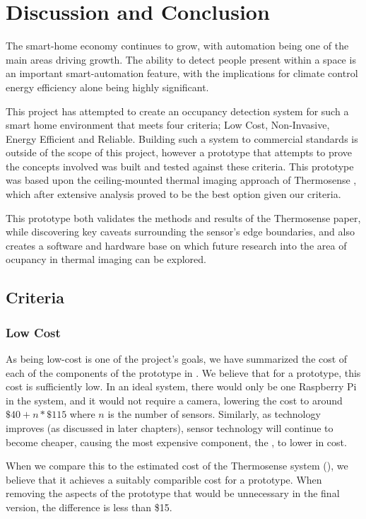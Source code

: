 \documentclass[../thesis/thesis.tex]{subfiles}
\begin{document}
 \chapter{Discussion and Conclusion}
The smart-home economy continues to grow, with automation being one of the main areas driving growth. The ability to detect people present within a space is an important smart-automation feature, with the implications for climate control energy efficiency alone being highly significant.

This project has attempted to create an occupancy detection system for such a smart home environment that meets four criteria; Low Cost, Non-Invasive, Energy Efficient and Reliable. Building such a system to commercial standards is outside of the scope of this project, however a prototype that attempts to prove the concepts involved was built and tested against these criteria. This prototype was based upon the ceiling-mounted thermal imaging approach of Thermosense \cite{beltran2013thermosense}, which after extensive analysis proved to be the best option given our criteria.

This prototype both validates the methods and results of the Thermosense paper, while discovering key caveats surrounding the sensor's edge boundaries, and also creates a software and hardware base on which future research into the area of ocupancy in thermal imaging can be explored.

\section{Criteria}

\subsection{Low Cost}
As being low-cost is one of the project's goals, we have summarized the cost of each of the components of the prototype in . We believe that for a prototype, this cost is sufficiently low. In an ideal system, there would only be one Raspberry Pi in the system, and it would not require a camera, lowering the cost to around $\$40 + n * \$115$ where $n$ is the number of sensors. Similarly, as technology improves (as discussed in later chapters), sensor technology will continue to become cheaper, causing the most expensive component, the \mlx, to lower in cost.

When we compare this to the estimated cost of the Thermosense system (), we believe that it achieves a suitably comparible cost for a prototype. When removing the aspects of the prototype that would be unnecessary in the final version, the difference is less than \$15.
\end{document}

